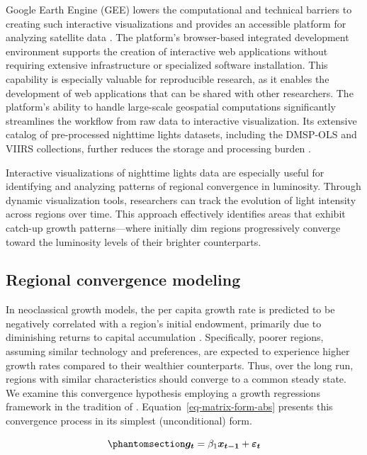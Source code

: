 \documentclass[
  a4paper, 
  twoside,
  review
]{article}
\begin{document}
Google Earth Engine (GEE) lowers the computational and technical
barriers to creating such interactive visualizations and provides an
accessible platform for analyzing satellite data \citep{gorelick_gee}.
The platform's browser-based integrated development environment supports
the creation of interactive web applications without requiring extensive
infrastructure or specialized software installation. This capability is
especially valuable for reproducible research, as it enables the
development of web applications that can be shared with other
researchers. The platform's ability to handle large-scale geospatial
computations significantly streamlines the workflow from raw data to
interactive visualization. Its extensive catalog of pre-processed
nighttime lights datasets, including the DMSP-OLS and VIIRS collections,
further reduces the storage and processing burden
\citep{tamiminia_gee_review}.

Interactive visualizations of nighttime lights data are especially
useful for identifying and analyzing patterns of regional convergence in
luminosity. Through dynamic visualization tools, researchers can track
the evolution of light intensity across regions over time. This approach
effectively identifies areas that exhibit catch-up growth
patterns---where initially dim regions progressively converge toward the
luminosity levels of their brighter counterparts.

\subsection{Regional convergence
modeling}\label{regional-convergence-modeling}

In neoclassical growth models, the per capita growth rate is predicted
to be negatively correlated with a region's initial endowment, primarily
due to diminishing returns to capital accumulation \citep{solow_growth}.
Specifically, poorer regions, assuming similar technology and
preferences, are expected to experience higher growth rates compared to
their wealthier counterparts. Thus, over the long run, regions with
similar characteristics should converge to a common steady state. We
examine this convergence hypothesis employing a growth regressions
framework in the tradition of \citet{barro_sala_convergence}.
Equation~\ref{eq-matrix-form-abs} presents this convergence process in
its simplest (unconditional) form.

\begin{equation}\phantomsection\label{eq-matrix-form-abs}{
\boldsymbol{g_t} =  \beta_1 \boldsymbol{x_{t-1}} +  \boldsymbol{\varepsilon_t}
}\end{equation}
\end{document}
